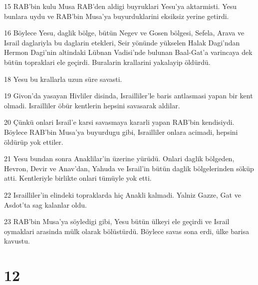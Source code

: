 \par 15 RAB'bin kulu Musa RAB'den aldigi buyruklari Yesu'ya aktarmisti. Yesu bunlara uydu ve RAB'bin Musa'ya buyurduklarini eksiksiz yerine getirdi.
\par 16 Böylece Yesu, daglik bölge, bütün Negev ve Gosen bölgesi, Sefela, Arava ve Israil daglariyla bu daglarin etekleri, Seir yönünde yükselen Halak Dagi'ndan Hermon Dagi'nin altindaki Lübnan Vadisi'nde bulunan Baal-Gat'a varincaya dek bütün topraklari ele geçirdi. Buralarin krallarini yakalayip öldürdü.
\par 18 Yesu bu krallarla uzun süre savasti.
\par 19 Givon'da yasayan Hivliler disinda, Israilliler'le baris antlasmasi yapan bir kent olmadi. Israilliler öbür kentlerin hepsini savasarak aldilar.
\par 20 Çünkü onlari Israil'e karsi savasmaya kararli yapan RAB'bin kendisiydi. Böylece RAB'bin Musa'ya buyurdugu gibi, Israilliler onlara acimadi, hepsini öldürüp yok ettiler.
\par 21 Yesu bundan sonra Anaklilar'in üzerine yürüdü. Onlari daglik bölgeden, Hevron, Devir ve Anav'dan, Yahuda ve Israil'in bütün daglik bölgelerinden söküp atti. Kentleriyle birlikte onlari tümüyle yok etti.
\par 22 Israilliler'in elindeki topraklarda hiç Anakli kalmadi. Yalniz Gazze, Gat ve Asdot'ta sag kalanlar oldu.
\par 23 RAB'bin Musa'ya söyledigi gibi, Yesu bütün ülkeyi ele geçirdi ve Israil oymaklari arasinda mülk olarak bölüstürdü. Böylece savas sona erdi, ülke barisa kavustu.

\chapter{12}

